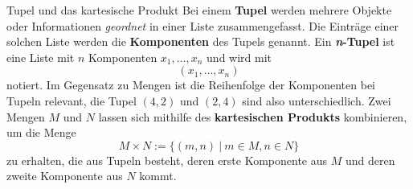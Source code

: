 \documentclass[../../main.tex]{subfiles}
\begin{document}
\begin{nutshell}{Tupel und das kartesische Produkt}
    Bei einem \textbf{Tupel} werden mehrere Objekte oder Informationen \emph{geordnet} in einer Liste zusammengefasst. Die Einträge einer solchen Liste werden die \textbf{Komponenten} des Tupels genannt. Ein \textbf{\emph{n}-Tupel} ist eine Liste mit $n$ Komponenten $x_1,\dots,x_n$ und wird mit \[(x_1,\dots,x_n)\] 
    notiert. Im Gegensatz zu Mengen ist die Reihenfolge der Komponenten bei Tupeln relevant, die Tupel $(4,2)$ und $(2,4)$ sind also unterschiedlich. Zwei Mengen $M$ und $N$ lassen sich mithilfe des \textbf{kartesischen Produkts} kombinieren, um die Menge 
    \[M\times N:=\{(m,n)~|~m\in M, n\in N\}\]
    zu erhalten, die aus Tupeln besteht, deren erste Komponente aus $M$ und deren zweite Komponente aus $N$ kommt.
\end{nutshell}
\end{document}
